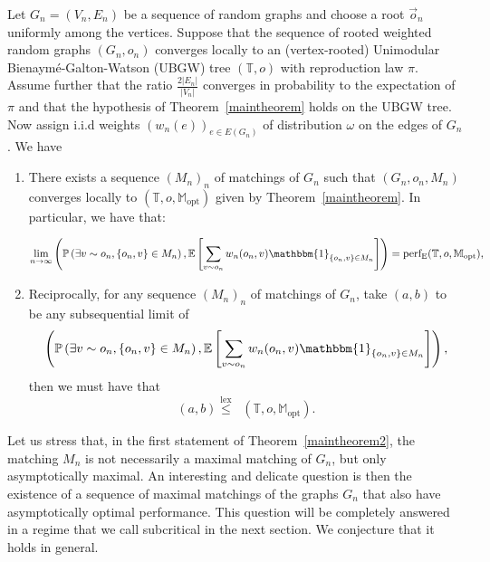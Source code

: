 \documentclass[11pt]{article}
\DeclareMathOperator{\perfE}{perf_E}
\begin{document}
\begin{theorem}\label{maintheorem2}
    Let $G_n=(V_n,E_n)$ be a sequence of random graphs and choose a root $\overset{\rightarrow}{o}_n$ uniformly among the vertices.
    Suppose that the sequence of rooted weighted random graphs $(G_n,o_n)$ converges locally to an (vertex-rooted) Unimodular Bienaymé-Galton-Watson (UBGW) tree $(\mathbb{T},o)$ with reproduction law $\pi$. Assume further that the ratio $\frac{2|E_n|}{|V_n|}$ converges in probability to the expectation of $\pi$ and that the hypothesis of Theorem~\ref{maintheorem} holds on the UBGW tree. Now assign i.i.d weights $(w_n(e))_{e \in E(G_n)}$ of distribution $\omega$ on the edges of $G_n$. We have
    \begin{enumerate}
        \item There exists a sequence $(M_n)_n$ of matchings of $G_n$ such that $(G_n,o_n,M_n)$ converges locally to $(\mathbb{T},{o},\mathbb{M}_{\mathrm{opt}})$ given by Theorem~\ref{maintheorem}.
        In particular, we have that:

         \[
        \lim_{n \to \infty} 
        \left(  \mathbb{P}\left( \exists v \sim o_n, \{o_n,v\} \in M_n\right),\mathbb{E}\left[ \sum_{v\sim o_n}w_n(o_n,v)\mathbbm{1}_{\{o_n,v\} \in M_n}\right]\right) = \perfE(\mathbb{T},o,\mathbb{M}_{\mathrm{opt}}),
        \]
        
        \item Reciprocally, for any sequence $(M_n)_n$ of matchings of $G_n$, take $(a,b)$ to be any subsequential limit of
        \[ \left(  \mathbb{P}\left( \exists v \sim o_n, \{o_n,v\} \in M_n\right),\mathbb{E}\left[ \sum_{v\sim o_n}w_n(o_n,v)\mathbbm{1}_{\{o_n,v\} \in M_n}\right]\right) ,\]
        then we must have that 
        \[ (a,b)\overset{\mathrm{lex}}{\leq} \perfE(\mathbb{T},o,\mathbb{M}_{\mathrm{opt}}).
        \]
    \end{enumerate}

\end{theorem}

\begin{remark}
  Let us stress that, in the first statement of Theorem~\ref{maintheorem2}, the matching $M_n$ is not necessarily a maximal matching of $G_n$, but only asymptotically maximal. An interesting and delicate question is then the existence of a sequence of maximal matchings of the graphs $G_n$ that also have asymptotically optimal performance. This question will be completely answered in a regime that we call subcritical in the next section. We conjecture that it holds in general.
\end{remark}
\end{document}
